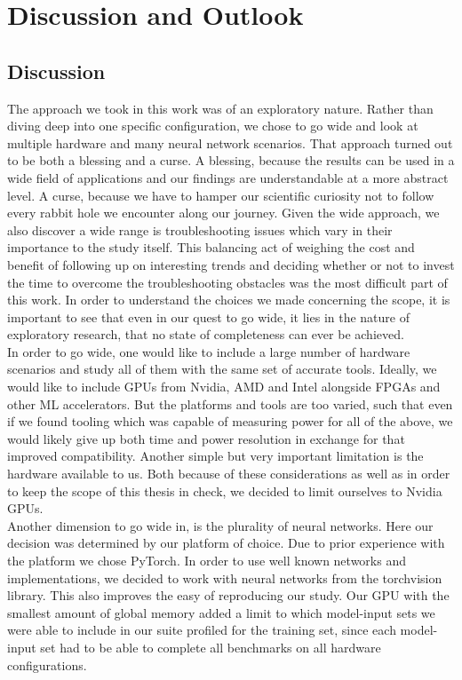 \chapter{Discussion and Outlook}\label{chap:discussion}

\section{Discussion}

The approach we took in this work was of an exploratory nature. Rather than diving deep into one specific configuration, we chose to go wide and look at multiple hardware and many neural network scenarios. That approach turned out to be both a blessing and a curse. A blessing, because the results can be used in a wide field of applications and our findings are understandable at a more abstract level. A curse, because we have to hamper our scientific curiosity not to follow every rabbit hole we encounter along our journey. Given the wide approach, we also discover a wide range is troubleshooting issues which vary in their importance to the study itself. This balancing act of weighing the cost and benefit of following up on interesting trends and deciding whether or not to invest the time to overcome the troubleshooting obstacles was the most difficult part of this work. In order to understand the choices we made concerning the scope, it is important to see that even in our quest to go wide, it lies in the nature of exploratory research, that no state of completeness can ever be achieved. \\
In order to go wide, one would like to include a large number of hardware scenarios and study all of them with the same set of accurate tools. Ideally, we would like to include GPUs from Nvidia, AMD and Intel alongside FPGAs and other ML accelerators. But the platforms and tools are too varied, such that even if we found tooling which was capable of measuring power for all of the above, we would likely give up both time and power resolution in exchange for that improved compatibility. Another simple but very important limitation is the hardware available to us. Both because of these considerations as well as in order to keep the scope of this thesis in check, we decided to limit ourselves to Nvidia GPUs. \\
Another dimension to go wide in, is the plurality of neural networks. Here our decision was determined by our platform of choice. Due to prior experience with the platform we chose PyTorch. In order to use well known networks and implementations, we decided to work with neural networks from the torchvision library. This also improves the easy of reproducing our study. Our GPU with the smallest amount of global memory added a limit to which model-input sets we were able to include in our suite profiled for the training set, since each model-input set had to be able to complete all benchmarks on all hardware configurations. \\
